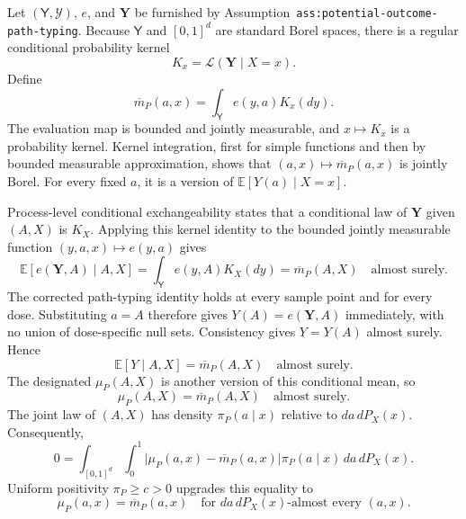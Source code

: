 Let \((\mathsf Y,\mathcal Y)\), \(e\), and \(\mathbf Y\) be furnished by Assumption~\texttt{ass:potential-outcome-path-typing}. Because \(\mathsf Y\) and \([0,1]^d\) are standard Borel spaces, there is a regular conditional probability kernel
\[
K_x=\mathcal L(\mathbf Y\mid X=x).
\]
Define
\[
\overline m_P(a,x)=\int_{\mathsf Y}e(y,a)K_x(dy).
\]
The evaluation map is bounded and jointly measurable, and \(x\mapsto K_x\) is a probability kernel. Kernel integration, first for simple functions and then by bounded measurable approximation, shows that \((a,x)\mapsto\overline m_P(a,x)\) is jointly Borel. For every fixed \(a\), it is a version of \(\mathbb E[Y(a)\mid X=x]\).

Process-level conditional exchangeability states that a conditional law of \(\mathbf Y\) given \((A,X)\) is \(K_X\). Applying this kernel identity to the bounded jointly measurable function \((y,a,x)\mapsto e(y,a)\) gives
\[
\mathbb E[e(\mathbf Y,A)\mid A,X]
=\int_{\mathsf Y}e(y,A)K_X(dy)
=\overline m_P(A,X)
\quad\text{almost surely}.
\]
The corrected path-typing identity holds at every sample point and for every dose. Substituting \(a=A\) therefore gives \(Y(A)=e(\mathbf Y,A)\) immediately, with no union of dose-specific null sets. Consistency gives \(Y=Y(A)\) almost surely. Hence
\[
\mathbb E[Y\mid A,X]=\overline m_P(A,X)
\quad\text{almost surely}.
\]
The designated \(\mu_P(A,X)\) is another version of this conditional mean, so
\[
\mu_P(A,X)=\overline m_P(A,X)
\quad\text{almost surely}.
\]
The joint law of \((A,X)\) has density \(\pi_P(a\mid x)\) relative to \(da\,dP_X(x)\). Consequently,
\[
0=\int_{[0,1]^d}\int_0^1
\lvert\mu_P(a,x)-\overline m_P(a,x)\rvert
\pi_P(a\mid x)\,da\,dP_X(x).
\]
Uniform positivity \(\pi_P\ge c>0\) upgrades this equality to
\[
\mu_P(a,x)=\overline m_P(a,x)
\quad\text{for }da\,dP_X(x)\text{-almost every }(a,x). \tag{1}
\]


